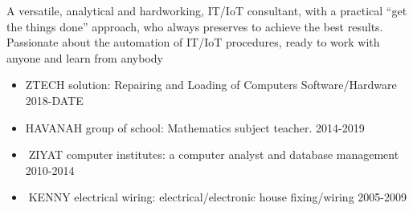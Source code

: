 \documentclass[10pt,a4paper,ragged2e]{altacv}
\begin{document}

\begin{fullwidth}
\makecvheader
\end{fullwidth}


A versatile, analytical and hardworking, IT/IoT consultant, with a practical “get the things done”  approach, who always preserves to achieve the best results. Passionate about the automation of IT/IoT procedures, ready to work with anyone and learn from anybody


\begin{itemize}
\item ZTECH solution: Repairing and Loading of Computers Software/Hardware	2018-DATE

\divider
\item HAVANAH group of school: Mathematics subject teacher.			2014-2019

\divider
\item ZIYAT computer institutes: a computer analyst and database management	2010-2014

\divider
\item KENNY electrical wiring: electrical/electronic house fixing/wiring			2005-2009
\end{itemize}
\end{document}

